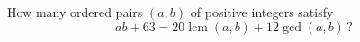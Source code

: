 How many ordered pairs $(a,b)$ of positive integers satisfy
\[ab+63=20\operatorname{lcm}(a,b)+12\gcd(a,b)\,?\]
